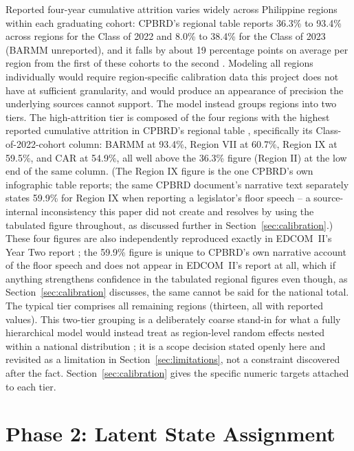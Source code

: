 \documentclass[11pt]{article}
\begin{document}
Reported four-year cumulative attrition varies widely across Philippine regions within each graduating cohort: CPBRD's regional table reports 36.3\% to 93.4\% across regions for the Class of 2022 and 8.0\% to 38.4\% for the Class of 2023 (BARMM unreported), and it falls by about 19 percentage points on average per region from the first of these cohorts to the second \citep{cpbrd2026}. Modeling all regions individually would require region-specific calibration data this project does not have at sufficient granularity, and would produce an appearance of precision the underlying sources cannot support. The model instead groups regions into two tiers. The high-attrition tier is composed of the four regions with the highest reported cumulative attrition in CPBRD's regional table \citep{cpbrd2026}, specifically its Class-of-2022-cohort column: BARMM at 93.4\%, Region VII at 60.7\%, Region IX at 59.5\%, and CAR at 54.9\%, all well above the 36.3\% figure (Region II) at the low end of the same column. (The Region IX figure is the one CPBRD's own infographic table reports; the same CPBRD document's narrative text separately states 59.9\% for Region IX when reporting a legislator's floor speech -- a source-internal inconsistency this paper did not create and resolves by using the tabulated figure throughout, as discussed further in Section~\ref{sec:calibration}.) These four figures are also independently reproduced exactly in EDCOM~II's Year Two report \citep{edcom2025y2}; the 59.9\% figure is unique to CPBRD's own narrative account of the floor speech and does not appear in EDCOM~II's report at all, which if anything strengthens confidence in the tabulated regional figures even though, as Section~\ref{sec:calibration} discusses, the same cannot be said for the national total. The typical tier comprises all remaining regions (thirteen, all with reported values). This two-tier grouping is a deliberately coarse stand-in for what a fully hierarchical model would instead treat as region-level random effects nested within a national distribution \citep{gelman2013bda}; it is a scope decision stated openly here and revisited as a limitation in Section~\ref{sec:limitations}, not a constraint discovered after the fact. Section~\ref{sec:calibration} gives the specific numeric targets attached to each tier.


\FloatBarrier
\section{Phase 2: Latent State Assignment}
\label{sec:phase2}
\end{document}

